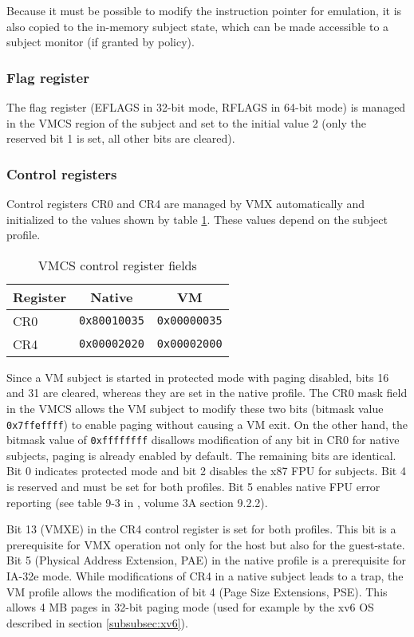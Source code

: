 Because it must be possible to modify the instruction pointer for emulation, it
is also copied to the in-memory subject state, which can be made accessible to a
subject monitor (if granted by policy).

\subsubsection{Flag register}
The flag register (EFLAGS in 32-bit mode, RFLAGS in 64-bit mode) is managed in
the VMCS region of the subject and set to the initial value 2 (only the reserved
bit 1 is set, all other bits are cleared).

\subsubsection{Control registers}\label{subsubsec:control-regs}
Control registers CR0 and CR4 are managed by VMX automatically and initialized
to the values shown by table \ref{tab:vmcs-control-regs}. These values depend
on the subject profile.

\begin{table}[h]
	\centering
	\begin{tabular}{l|c|c}
		\textbf{Register} & \textbf{Native} & \textbf{VM} \\
		\hline
		CR0 & \texttt{0x80010035} & \texttt{0x00000035} \\
		CR4 & \texttt{0x00002020} & \texttt{0x00002000} \\
		\hline
	\end{tabular}
	\caption{VMCS control register fields}
	\label{tab:vmcs-control-regs}
\end{table}

Since a VM subject is started in protected mode with paging disabled, bits 16
and 31 are cleared, whereas they are set in the native profile. The CR0 mask
field in the VMCS allows the VM subject to modify these two bits (bitmask value
\texttt{0x7ffeffff}) to enable paging without causing a VM exit. On the other
hand, the bitmask value of \texttt{0xffffffff} disallows modification of any bit
in CR0 for native subjects, paging is already enabled by default. The remaining
bits are identical. Bit 0 indicates protected mode and bit 2 disables the x87
FPU for subjects. Bit 4 is reserved and must be set for both profiles. Bit 5
enables native FPU error reporting (see table 9-3 in \cite{IntelSDM}, volume 3A
section 9.2.2).

Bit 13 (VMXE) in the CR4 control register is set for both profiles. This bit is
a prerequisite for VMX operation not only for the host but also for the
guest-state. Bit 5 (Physical Address Extension, PAE) in the native
profile is a prerequisite for IA-32e mode. While modifications of CR4 in a
native subject leads to a trap, the VM profile allows the modification of bit 4
(Page Size Extensions, PSE). This allows 4 MB pages in 32-bit paging
mode (used for example by the xv6 OS described in section \ref{subsubsec:xv6}).

